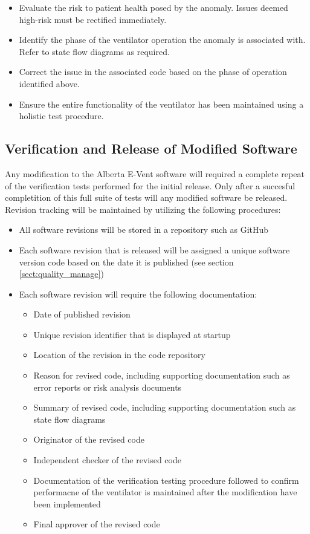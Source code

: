 \documentclass[]{article}
\begin{document}
\begin{itemize}
	\item Evaluate the risk to patient health posed by the anomaly.  Issues deemed high-risk must be rectified immediately.
	\item Identify the phase of the ventilator operation the anomaly is associated with.  Refer to state flow diagrams as required.
	\item Correct the issue in the associated code based on the phase of operation identified above.
	\item Ensure the entire functionality of the ventilator has been maintained using a holistic test procedure.
\end{itemize}

\subsection{Verification and Release of Modified Software}
\label{sect:mod_tests}
Any modification to the Alberta E-Vent software will required a complete repeat of the verification tests performed for the initial release.  Only after a succesful completition of this full suite of tests will any modified software be released.  Revision tracking will be maintained by utilizing the following procedures:
\begin{itemize}
	\item All software revisions will be stored in a repository such as GitHub
	\item Each software revision that is released will be assigned a unique software version code based on the date it is published (see section \ref{sect:quality_manage})
	\item Each software revision will require the following documentation:
	\begin{itemize}
		\item Date of published revision
		\item Unique revision identifier that is displayed at startup
		\item Location of the revision in the code repository
		\item Reason for revised code, including supporting documentation such as error reports or risk analysis documents
		\item Summary of revised code, including supporting documentation such as state flow diagrams 
		\item Originator of the revised code
		\item Independent checker of the revised code
		\item Documentation of the verification testing procedure followed to confirm performacne of the ventilator is maintained after the modification have been implemented
		\item Final approver of the revised code
	\end{itemize}
\end{itemize}
\end{document}
